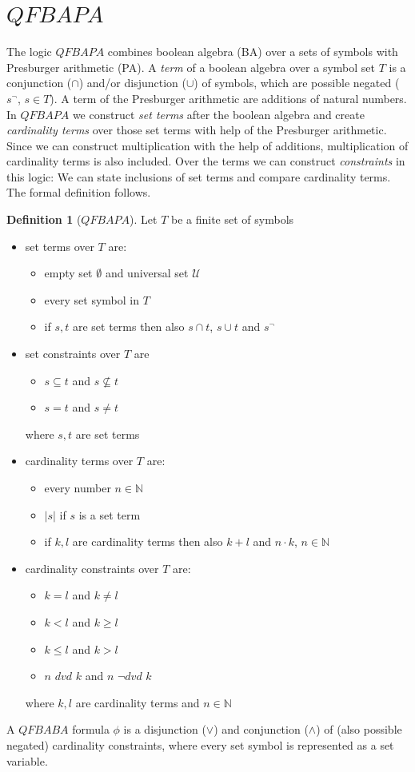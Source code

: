 \documentclass{book}
\theoremstyle{break}
\theoremstyle{definition}
\newtheorem{mydef}{Definition}
\begin{document}
\section{$QFBAPA$}
The logic $QFBAPA$ combines boolean algebra (BA) over a sets of symbols with Presburger arithmetic (PA). A \textit{term} of a boolean algebra over a symbol set $T$ is a conjunction ($\cap$) and/or disjunction ($\cup$) of symbols, which are possible negated ($s^\neg$, $s\in T$). A term of the Presburger arithmetic are additions of natural numbers. In $QFBAPA$ we construct \textit{set terms} after the boolean algebra and create \textit{cardinality terms} over those set terms with help of the Presburger arithmetic. Since we can construct multiplication with the help of additions, multiplication of cardinality terms is also included. Over the terms we can construct \textit{constraints} in this logic: We can state inclusions of set terms and compare cardinality terms. The formal definition follows.
\begin{mydef}[$QFBAPA$]
Let $T$ be a finite set of symbols
\begin{itemize}
\item set terms over $T$ are:
\begin{itemize}
\item empty set $\emptyset$ and universal set $
\mathcal{U}$
\item every set symbol in $T$
\item if $s,t$ are set terms then also $s\cap t$, $s\cup t$ and $s^{\neg}$
\end{itemize}
\item set constraints over $T$ are
\begin{itemize}
\item $s\subseteq t$ and $s\not\subseteq t$
\item $s=t$ and $s\neq t$
\end{itemize}
where $s,t$ are set terms
\item cardinality terms over $T$ are:
\begin{itemize}
\item every number $n\in \mathbb{N}$
\item $|s|$ if $s$ is a set term
\item if $k,l$ are cardinality terms then also $k+l$ and $n\cdot k$, $n\in \mathbb{N}$
\end{itemize}
\item cardinality constraints over $T$ are:
\begin{itemize}
\item $k=l$ and $k\neq l$
\item $k<l$ and $k\geq l$
\item $k\leq l$ and $k>l$
\item $n$ $dvd$ $k$ and $n$ $\neg dvd$ $k$
\end{itemize}
where $k,l$ are cardinality terms and $n\in\mathbb{N}$
\end{itemize}
A $QFBABA$ formula $\phi$ is a disjunction ($\vee$) and conjunction ($\wedge$) of (also possible negated) cardinality constraints, where every set symbol is represented as a set variable.
\end{mydef}
\end{document}
